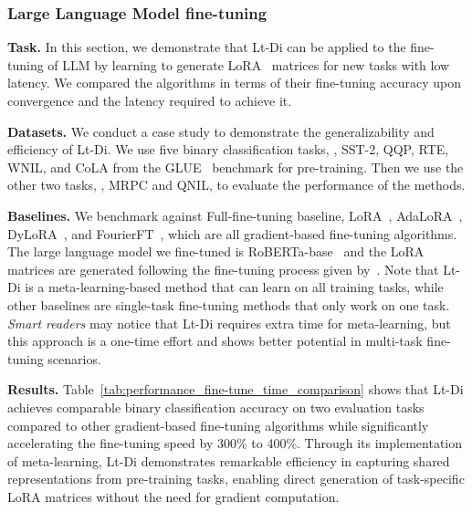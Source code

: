 \subsubsection{Large Language Model fine-tuning}
\noindent\textbf{Task.}
In this section, we demonstrate that Lt-Di can be applied to the fine-tuning of LLM by learning to generate LoRA~\cite{LoRa} matrices for new tasks with low latency. We compared the algorithms in terms of their fine-tuning accuracy upon convergence and the latency required to achieve it.
\par
\noindent\textbf{Datasets.}
We conduct a case study to demonstrate the generalizability and efficiency of Lt-Di. We use five binary classification tasks, \ie, SST-2, QQP, RTE, WNIL, and CoLA from the GLUE~\cite{GLUE} benchmark for pre-training. Then we use the other two tasks, \ie, MRPC and QNIL, to evaluate the performance of the methods.
\par
\noindent\textbf{Baselines.}
We benchmark against Full-fine-tuning baseline, LoRA~\cite{LoRa}, AdaLoRA~\cite{AdaLoRA}, DyLoRA~\cite{DyLoRA}, and FourierFT~\cite{FourierFT}, which are all gradient-based fine-tuning algorithms. The large language model we fine-tuned is RoBERTa-base~\cite{FourierFT} and the LoRA matrices are generated following the fine-tuning process given by~\citet{FourierFT}. Note that Lt-Di is a meta-learning-based method that can learn on all training tasks, while other baselines are single-task fine-tuning methods that only work on one task. \textit{Smart readers} may notice that Lt-Di requires extra time for meta-learning, but this approach is a one-time effort and shows better potential in multi-task fine-tuning scenarios.
\par
\noindent\textbf{Results.}
Table~\ref{tab:performance_fine-tune_time_comparison} shows that Lt-Di achieves comparable binary classification accuracy on two evaluation tasks compared to other gradient-based fine-tuning algorithms while significantly accelerating the fine-tuning speed by 300\% to 400\%. Through its implementation of meta-learning, Lt-Di demonstrates remarkable efficiency in capturing shared representations from pre-training tasks, enabling direct generation of task-specific LoRA matrices without the need for gradient computation.

